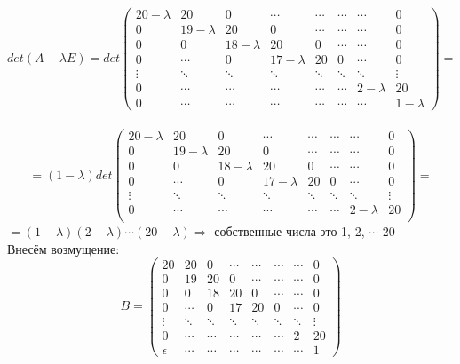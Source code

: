         \[
    det(A-\lambda E) = 
    det \begin{pmatrix}
    20-\lambda & 20 & 0 &\cdots & \cdots &\cdots & \cdots &0  \\
    0 & 19-\lambda & 20 & 0 & \cdots &\cdots  & \cdots & 0\\
    0 & 0 & 18-\lambda & 20 & 0 &\cdots & \cdots & 0\\
    0 &\cdots& 0 & 17-\lambda & 20 & 0 & \cdots & 0\\
    \vdots & \ddots & \ddots & \ddots & \ddots & \ddots & \ddots & \vdots \\

    0 & \cdots & \cdots & \cdots & \cdots & \cdots & 2-\lambda & 20\\
    
    0 & \cdots & \cdots & \cdots & \cdots & \cdots & \cdots & 1-\lambda
    \end{pmatrix}
    = \] \\ 
    \[=(1-\lambda)det \begin{pmatrix}
    20-\lambda & 20 & 0 &\cdots & \cdots &\cdots & \cdots &0  \\
    0 & 19-\lambda & 20 & 0 & \cdots &\cdots  & \cdots & 0\\
    0 & 0 & 18-\lambda & 20 & 0 &\cdots & \cdots & 0\\
    0 &\cdots& 0 & 17-\lambda & 20 & 0 & \cdots & 0\\
    \vdots & \ddots & \ddots & \ddots & \ddots & \ddots & \ddots & \vdots \\

    0 & \cdots & \cdots & \cdots & \cdots & \cdots & 2-\lambda & 20\\
    
    \end{pmatrix} =
    \]
    \(
    = (1-\lambda)(2-\lambda)\cdots(20-\lambda) \Rightarrow\) собственные числа это 1, 2, \(\cdots\) 20 \\
    Внесём возмущение: 
        \[
    B = 
    \begin{pmatrix}
    20 & 20 & 0 &\cdots & \cdots &\cdots & \cdots &0  \\
    0 & 19 & 20 & 0 & \cdots &\cdots  & \cdots & 0\\
    0 & 0 & 18 & 20 & 0 &\cdots & \cdots & 0\\
    0 &\cdots& 0 & 17 & 20 & 0 & \cdots & 0\\
    \vdots & \ddots & \ddots & \ddots & \ddots & \ddots & \ddots & \vdots \\

    0 & \cdots & \cdots & \cdots & \cdots & \cdots & 2 & 20 \\
    \epsilon & \cdots & \cdots & \cdots & \cdots & \cdots & \cdots & 1
    \end{pmatrix}
    \] \\
